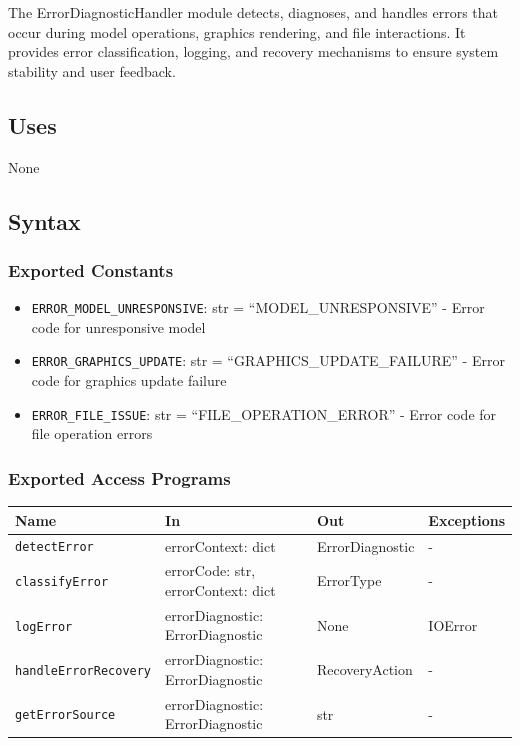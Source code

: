 \documentclass[12pt, titlepage]{article}
\begin{document}
The ErrorDiagnosticHandler module detects, diagnoses, and handles errors that occur during model operations, graphics rendering, and file interactions. It provides error classification, logging, and recovery mechanisms to ensure system stability and user feedback.

\subsection{Uses}

None

\subsection{Syntax}

\subsubsection{Exported Constants}

\begin{itemize}
\item \texttt{ERROR\_MODEL\_UNRESPONSIVE}: str = ``MODEL\_UNRESPONSIVE'' - Error code for unresponsive model
\item \texttt{ERROR\_GRAPHICS\_UPDATE}: str = ``GRAPHICS\_UPDATE\_FAILURE'' - Error code for graphics update failure
\item \texttt{ERROR\_FILE\_ISSUE}: str = ``FILE\_OPERATION\_ERROR'' - Error code for file operation errors
\end{itemize}

\subsubsection{Exported Access Programs}

\begin{center}
\renewcommand{\arraystretch}{1.55}
\begin{tabular}{p{4cm} p{5cm} p{3cm} p{3cm}}
\hline
\textbf{Name} & \textbf{In} & \textbf{Out} & \textbf{Exceptions} \\
\hline
\texttt{detectError} & errorContext: dict & ErrorDiagnostic & - \\
\texttt{classifyError} & errorCode: str, \newline errorContext: dict & ErrorType & - \\
\texttt{logError} & errorDiagnostic: ErrorDiagnostic & None & IOError \\
\texttt{handleErrorRecovery}& errorDiagnostic: ErrorDiagnostic & RecoveryAction & - \\
\texttt{getErrorSource} & errorDiagnostic: ErrorDiagnostic & str & - \\
\hline
\end{tabular}
\end{center}
\end{document}

